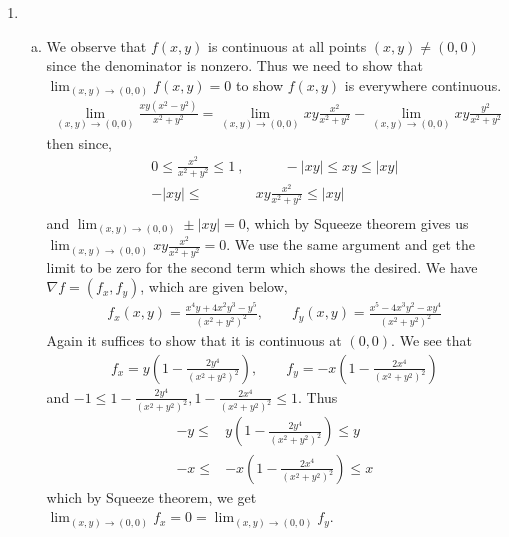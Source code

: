 \documentclass[a4paper,12pt]{article}
\theoremstyle{definition}
\begin{document}
\begin{enumerate}
\item
\begin{enumerate}[(a)]
\item We observe that $f(x,y)$ is continuous at all points $(x,y) \neq (0,0)$ since the denominator is nonzero. Thus we need to show that $\lim_{(x,y) \to (0,0)}f(x,y)=0$ to show $f(x,y)$ is everywhere continuous.
\begin{align*}
\lim_{(x,y) \to (0,0)}\frac{xy(x^2-y^2)}{x^2+y^2} = \lim_{(x,y) \to (0,0)}xy\frac{x^2}{x^2+y^2} - \lim_{(x,y) \to (0,0)}xy\frac{y^2}{x^2+y^2}
\end{align*}
then since,
\begin{align*}
0 \leq \frac{x^2}{x^2+y^2} \leq 1~,&\qquad -|xy| \leq xy \leq |xy|\\
-|xy| \leq &xy\frac{x^2}{x^2+y^2} \leq|xy|\\
\end{align*}
and $\lim_{(x,y) \to (0,0)}\pm|xy|=0$, which by Squeeze theorem gives us $\lim_{(x,y) \to (0,0)}xy\frac{x^2}{x^2+y^2}=0$. We use the same argument and get the limit to be zero for the second term which shows the desired.
We have $\nabla f = (f_x, f_y)$, which are given below,
\begin{align*}
f_x(x,y) = \frac{x^4y+4x^2y^3-y^5}{(x^2+y^2)^2},\qquad f_y(x,y) = \frac{x^5-4x^3y^2-xy^4}{(x^2+y^2)^2}
\end{align*}
Again it suffices to show that it is continuous at $(0,0)$. We see that 
\begin{align*}
f_x = y \left(1-\frac{2y^4}{(x^2+y^2)^2}\right), \qquad f_y = -x \left(1-\frac{2x^4}{(x^2+y^2)^2}\right)
\end{align*}
and $-1\leq 1-\frac{2y^4}{(x^2+y^2)^2},1-\frac{2x^4}{(x^2+y^2)^2}\leq 1$. Thus 
\begin{align*}
-y\leq &y\left(1-\frac{2y^4}{(x^2+y^2)^2}\right)\leq y\\
-x \leq &-x\left(1-\frac{2x^4}{(x^2+y^2)^2}\right)\leq x
\end{align*}
which by Squeeze theorem, we get $\lim_{(x,y)\to (0,0)}f_x = 0 = \lim_{(x,y)\to (0,0)}f_y$.


\end{enumerate}
\end{enumerate}
\end{document}
